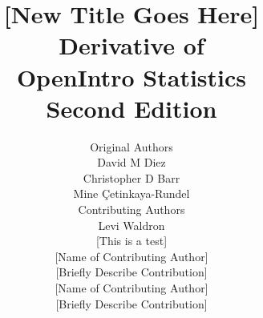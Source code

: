 

\title{\huge [New Title Goes Here] \\[2mm]
\large Derivative of \\
OpenIntro Statistics \\
Second Edition}
\author{\Large Original Authors \\[1.5mm]
\normalsize David M Diez \\
\normalsize Christopher D Barr \\
\normalsize Mine \c{C}etinkaya-Rundel \\[8mm]
\Large Contributing Authors \\[1.5mm]
\normalsize Levi Waldron \\
\small [This is a test] \\[2mm]
\normalsize [Name of Contributing Author] \\
\small [Briefly Describe Contribution] \\[2mm]
\normalsize [Name of Contributing Author] \\
\small [Briefly Describe Contribution] \\[2mm]
}

